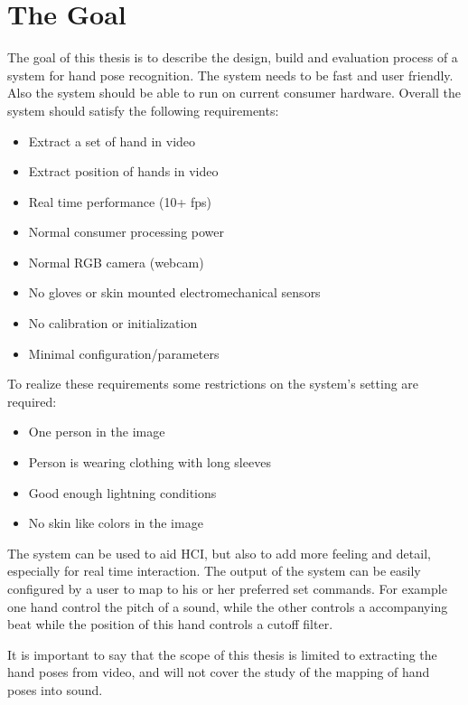 \section{The Goal}
\label{sec:goal}
The goal of this thesis is to describe the design, build and evaluation process of a system for hand pose recognition. The system needs to be fast and user friendly. Also the system should be able to run on current consumer hardware. Overall the system should satisfy the following requirements:

\begin{itemize}
	\item Extract a set of hand in video
	\item Extract position of hands in video
	\item Real time performance (10+ fps)
	\item Normal consumer processing power
	\item Normal RGB camera (webcam)
	\item No gloves or skin mounted electromechanical sensors
	\item No calibration or initialization
	\item Minimal configuration/parameters
\end{itemize}
	
To realize these requirements some restrictions on the system's setting are required:

\begin{itemize}
	\item One person in the image
	\item Person is wearing clothing with long sleeves
	\item Good enough lightning conditions
	\item No skin like colors in the image
\end{itemize}

The system can be used to aid HCI, but also to add more feeling and detail, especially for real time interaction. The output of the system can be easily configured by a user to map to his or her preferred set commands. For example one hand control the pitch of a sound, while the other controls a accompanying beat while the position of this hand controls a cutoff filter. 

It is important to say that the scope of this thesis is limited to extracting the hand poses from video, and will not cover the study of the mapping of hand poses into sound. 



